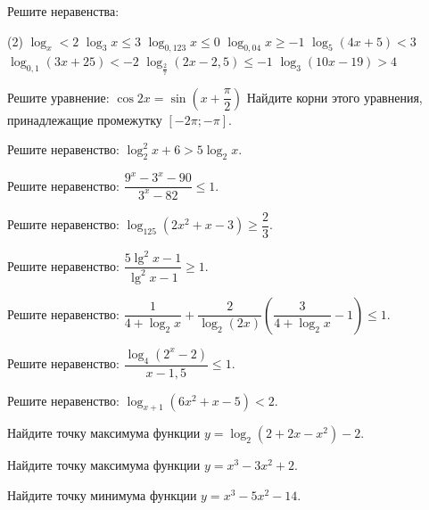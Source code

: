 \begin{class}[number=4]
	\begin{listofex}
		\item Решите неравенства: %
		\begin{tasks}(2)
			\task \( \log_x<2 \)
			\task \( \log_3x\le3 \)
			\task \( \log_{0,123}x \le 0 \)
			\task \( \log_{0,04}x \ge -1 \)
			\task \( \log_5 (4x+5) < 3 \)
			\task \( \log_{0,1}(3x+25)<-2 \)
			\task \( \log_{\tfrac{2}{7}}(2x-2,5)\le -1 \)
			\task \( \log_3 (10x-19)>4 \)
		\end{tasks}
	\end{listofex}
\end{class}

\begin{homework}[number=2]
	\begin{listofex}
		\item 
		\begin{tasks}
			\task Решите уравнение: \( \cos 2x = \sin \left( x+\dfrac{ \pi }{ 2 } \right) \)
			\task Найдите корни этого уравнения, принадлежащие промежутку \( [-2\pi; -\pi] \).
		\end{tasks}
		\item Решите неравенство: \( \log^2_2 x + 6 > 5\log_2 x \).
		
		\item Решите неравенство: \( \dfrac{ 9^x-3^x-90 }{3^x-82  } \le 1 \).
		\item Решите неравенство: \(\log_{125}(2x^2+x-3) \ge \dfrac{ 2 }{ 3 }\).
		
		\item Решите неравенство: \( \dfrac{ 5\lg^2x-1 }{ \lg^2x -1}\ge1 \).
		\item Решите неравенство: \( \dfrac{ 1 }{ 4+\log_2x }+\dfrac{ 2 }{ \log_2(2x) }\left( \dfrac{ 3 }{ 4+\log_2x }-1 \right) \le 1 \).
		\item Решите неравенство: \( \dfrac{ \log_4(2^x-2)}{ x-1,5 } \le 1 \).
		\item Решите неравенство: \( \log_{x+1}(6x^2+x-5)<2 \).
		\item Найдите точку максимума функции \(y=\log_2 (2+2x-x^2)-2\).
		
		\item Найдите точку максимума функции \(y=x^3-3x^2+2\).
		\item Найдите точку минимума функции \(y=x^3-5x^2-14\).
		

\end{listofex}
\end{homework}
